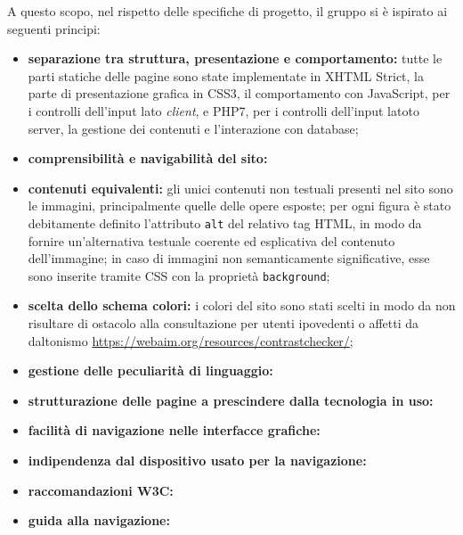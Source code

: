 A questo scopo, nel rispetto delle specifiche di progetto, il gruppo si è ispirato ai seguenti principi:
\begin{itemize}
	\item \textbf{separazione tra struttura, presentazione e comportamento:} tutte le parti statiche delle pagine sono state implementate in XHTML Strict, la parte di presentazione grafica in CSS3, il comportamento con JavaScript, per i controlli dell'input lato \textit{client}, e PHP7, per i controlli dell'input latoto server, la gestione dei contenuti e l'interazione con database;
	\item \textbf{comprensibilità e navigabilità del sito:} 
	\item \textbf{contenuti equivalenti:} gli unici contenuti non testuali presenti nel sito sono le immagini, principalmente quelle delle opere esposte; per ogni figura è stato debitamente definito l'attributo \texttt{alt} del relativo tag HTML, in modo da fornire un'alternativa testuale coerente ed esplicativa del contenuto dell'immagine; in caso di immagini non semanticamente significative, esse sono inserite tramite CSS con la proprietà \texttt{background};
	\item \textbf{scelta dello schema colori:} i colori del sito sono stati scelti in modo da non risultare di ostacolo alla consultazione per utenti ipovedenti o affetti da daltonismo \url{https://webaim.org/resources/contrastchecker/}; 
	\item \textbf{gestione delle peculiarità di linguaggio:}
	\item \textbf{strutturazione delle pagine a prescindere dalla tecnologia in uso:}
	\item \textbf{facilità di navigazione nelle interfacce grafiche:}
	\item \textbf{indipendenza dal dispositivo usato per la navigazione:}
	\item \textbf{raccomandazioni W3C:}
	\item \textbf{guida alla navigazione:}
\end{itemize}

